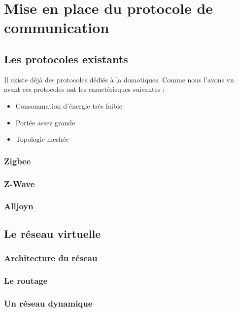 \chapter{Mise en place du protocole de communication}

\section{Les protocoles existants}
Il existe déjà des protocoles dédiés à la domotiques. Comme nous l'avons vu avant ces protocoles ont les 
caractérisques suivantes :
\begin{itemize}
 \item Consommation d'énergie très faible
 \item Portée assez grande
 \item Topologie meshée
\end{itemize}

	\subsection{Zigbee}
	\subsection{Z-Wave}
	\subsection{Alljoyn}

\section{Le réseau virtuelle}
	\subsection{Architecture du réseau}
	\subsection{Le routage}
	\subsection{Un réseau dynamique}


